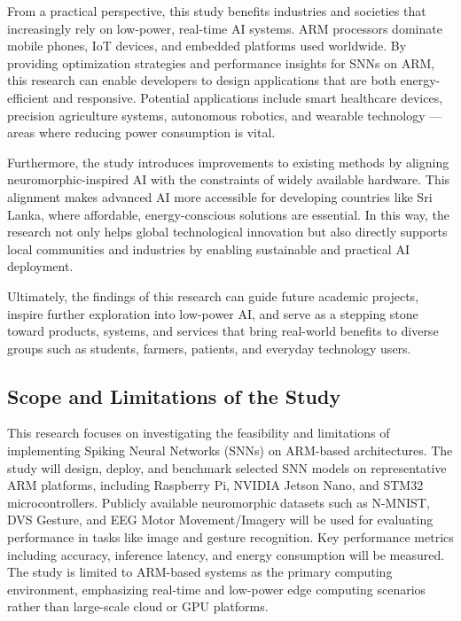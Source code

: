 \documentclass[a4paper,12pt]{article}
\begin{document}
	From a practical perspective, this study benefits industries and societies that increasingly rely on low-power, real-time AI systems. ARM processors dominate mobile phones, IoT devices, and embedded platforms used worldwide. By providing optimization strategies and performance insights for SNNs on ARM, this research can enable developers to design applications that are both energy-efficient and responsive. Potential applications include smart healthcare devices, precision agriculture systems, autonomous robotics, and wearable technology — areas where reducing power consumption is vital.
	
	Furthermore, the study introduces improvements to existing methods by aligning neuromorphic-inspired AI with the constraints of widely available hardware. This alignment makes advanced AI more accessible for developing countries like Sri Lanka, where affordable, energy-conscious solutions are essential. In this way, the research not only helps global technological innovation but also directly supports local communities and industries by enabling sustainable and practical AI deployment.
	
	Ultimately, the findings of this research can guide future academic projects, inspire further exploration into low-power AI, and serve as a stepping stone toward products, systems, and services that bring real-world benefits to diverse groups such as students, farmers, patients, and everyday technology users.
	
	\subsection{Scope and Limitations of the Study}
	This research focuses on investigating the feasibility and limitations of implementing Spiking Neural Networks (SNNs) on ARM-based architectures. The study will design, deploy, and benchmark selected SNN models on representative ARM platforms, including Raspberry Pi, NVIDIA Jetson Nano, and STM32 microcontrollers. Publicly available neuromorphic datasets such as N-MNIST, DVS Gesture, and EEG Motor Movement/Imagery will be used for evaluating performance in tasks like image and gesture recognition. Key performance metrics including accuracy, inference latency, and energy consumption will be measured. The study is limited to ARM-based systems as the primary computing environment, emphasizing real-time and low-power edge computing scenarios rather than large-scale cloud or GPU platforms.
	
\end{document}
